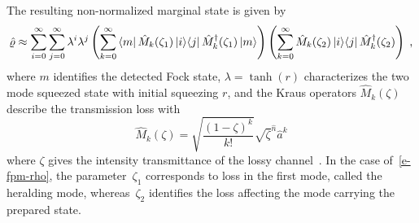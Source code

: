 \documentclass{article}
\begin{document}
The resulting non-normalized marginal state is given by
%
\begin{equation}\label{e-fpm-rho}
  \hatrho \approx
  \sum_{i = 0}^{\infty} 
  \sum_{j = 0}^{\infty}
    \lambda^{i} \lambda^{j}
    \left(
      \sum_{k = 0}^{\infty}
        \bra{m} \hat{M}_{k} (\zeta_{1}) \ketbra{i}{j} \hat{M}_{k}^{\dagger} (\zeta_{1}) \ket{m}
    \right)
    \left(
      \sum_{k = 0}^{\infty}
        \hat{M}_{k}(\zeta_{2}) \ketbra{i}{j} \hat{M}_{k}^{\dagger} (\zeta_{2})
    \right) \Qc
\end{equation}
%
where $m$ identifies the detected Fock state, $\lambda = \tanh(r)$ characterizes the two mode squeezed state with initial squeezing $r$, and the Kraus operators $\hat{M}_{k} (\zeta) $ describe the transmission loss with
%
\begin{equation}
  \hat{M}_{k} (\zeta) =
    \sqrt{ \frac{(1 - \zeta)^{k}}{k!} } 
    \sqrt{\zeta}^{\hat{n}} \hat{a}^{k}
\end{equation}
%
where $\zeta$ gives the intensity transmittance of the lossy channel~\cite{ivan2011}. In the case of~\eqref{e-fpm-rho}, the parameter~$\zeta_{1}$ corresponds to loss in the first mode, called the heralding mode, whereas~$\zeta_{2}$ identifies the loss affecting the mode carrying the prepared state.
\end{document}
